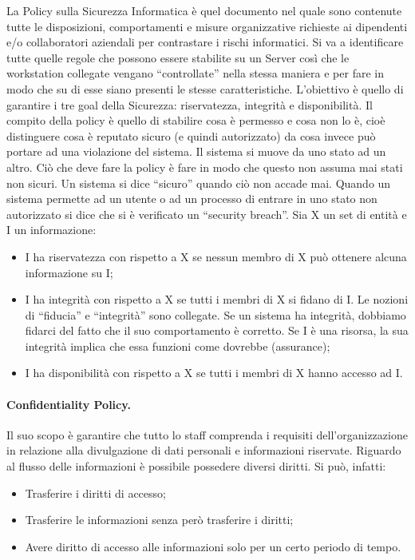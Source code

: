 La Policy sulla Sicurezza Informatica è quel documento nel quale sono
contenute tutte le
disposizioni, comportamenti e misure organizzative richieste ai dipendenti
e/o collaboratori
aziendali per contrastare i rischi informatici. Si va a identificare tutte
quelle regole che possono
essere stabilite su un Server così che le workstation collegate vengano
``controllate'' nella stessa
maniera e per fare in modo che su di esse siano presenti le stesse
caratteristiche.
L'obiettivo è quello di garantire i tre goal della Sicurezza:
riservatezza, integrità e disponibilità.
Il compito della policy è quello di stabilire cosa è permesso e cosa non
lo è, cioè distinguere cosa è
reputato sicuro (e quindi autorizzato) da cosa invece può portare ad una
violazione del sistema. Il
sistema si muove da uno stato ad un altro. Ciò che deve fare la policy è
fare in modo che questo
non assuma mai stati non sicuri. Un sistema si dice ``sicuro'' quando ciò
non accade mai.
Quando un sistema permette ad un utente o ad un processo di entrare in uno
stato non autorizzato
si dice che si è verificato un ``security breach''.
Sia X un set di entità e I un informazione:
\begin{itemize}
      \item I ha riservatezza con rispetto a X se nessun membro di X può
            ottenere alcuna
            informazione su I;
      \item I ha integrità con rispetto a X se tutti i membri di X si fidano
            di I. Le nozioni di ``fiducia'' e
            ``integrità'' sono collegate. Se un sistema ha integrità, dobbiamo
            fidarci del fatto che il suo
            comportamento è corretto. Se I è una risorsa, la sua integrità implica
            che essa funzioni
            come dovrebbe (assurance);
      \item I ha disponibilità con rispetto a X se tutti i membri di X hanno
            accesso ad I.
\end{itemize}


\paragraph{Confidentiality Policy.}

Il suo scopo è garantire che tutto lo staff comprenda i requisiti
dell'organizzazione in relazione alla
divulgazione di dati personali e informazioni riservate.
Riguardo al flusso delle informazioni è possibile possedere diversi
diritti. Si può, infatti:
\begin{itemize}
      \item Trasferire i diritti di accesso;
      \item Trasferire le informazioni senza però trasferire i diritti;
      \item Avere diritto di accesso alle informazioni solo per un certo
            periodo di tempo.
\end{itemize}

